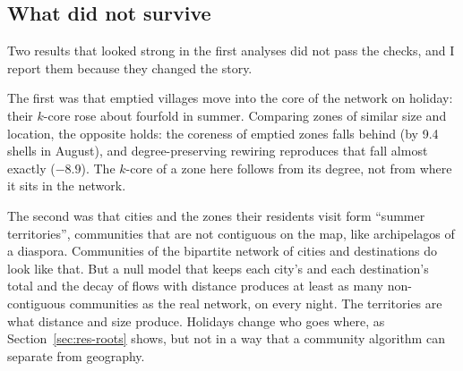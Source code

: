 \subsection{What did not survive}\label{sec:res-failed}

Two results that looked strong in the first analyses did not pass the checks, and I report them because they changed the story.

The first was that emptied villages move into the core of the network on holiday: their $k$-core rose about fourfold in summer. Comparing zones of similar size and location, the opposite holds: the coreness of emptied zones falls behind (by 9.4 shells in August), and degree-preserving rewiring reproduces that fall almost exactly ($-8.9$). The $k$-core of a zone here follows from its degree, not from where it sits in the network.

The second was that cities and the zones their residents visit form ``summer territories'', communities that are not contiguous on the map, like archipelagos of a diaspora. Communities of the bipartite network of cities and destinations do look like that. But a null model that keeps each city's and each destination's total and the decay of flows with distance produces at least as many non-contiguous communities as the real network, on every night. The territories are what distance and size produce. Holidays change who goes where, as Section~\ref{sec:res-roots} shows, but not in a way that a community algorithm can separate from geography.
